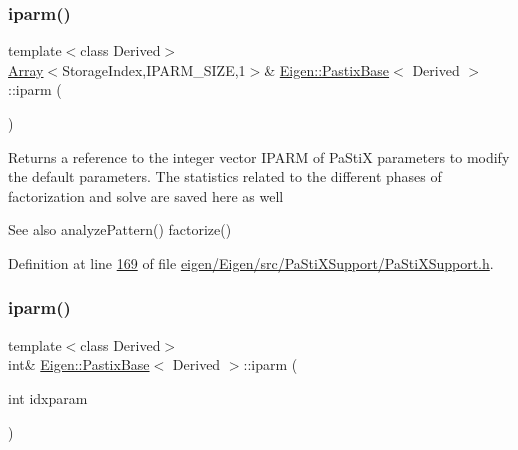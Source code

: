 \mbox{\label{class_eigen_1_1_pastix_base_a38378e7b2b5c750a8a23e2c21a69146c}} 
\subsubsection{\texorpdfstring{iparm()}{iparm()}\hspace{0.1cm}{\footnotesize\ttfamily [2/4]}}
{\footnotesize\ttfamily template$<$class Derived$>$ \\
\hyperlink{group___core___module_class_eigen_1_1_array}{Array}$<$Storage\+Index,I\+P\+A\+R\+M\+\_\+\+S\+I\+ZE,1$>$\& \hyperlink{class_eigen_1_1_pastix_base}{Eigen\+::\+Pastix\+Base}$<$ Derived $>$\+::iparm (\begin{DoxyParamCaption}{ }\end{DoxyParamCaption})\hspace{0.3cm}{\ttfamily [inline]}}

Returns a reference to the integer vector I\+P\+A\+RM of Pa\+StiX parameters to modify the default parameters. The statistics related to the different phases of factorization and solve are saved here as well \begin{DoxySeeAlso}{See also}
analyze\+Pattern() factorize() 
\end{DoxySeeAlso}


Definition at line \hyperlink{eigen_2_eigen_2src_2_pa_sti_x_support_2_pa_sti_x_support_8h_source_l00169}{169} of file \hyperlink{eigen_2_eigen_2src_2_pa_sti_x_support_2_pa_sti_x_support_8h_source}{eigen/\+Eigen/src/\+Pa\+Sti\+X\+Support/\+Pa\+Sti\+X\+Support.\+h}.

\mbox{\label{class_eigen_1_1_pastix_base_a5509ca8d6a9217fb95ab020363b9e0fb}} 
\subsubsection{\texorpdfstring{iparm()}{iparm()}\hspace{0.1cm}{\footnotesize\ttfamily [3/4]}}
{\footnotesize\ttfamily template$<$class Derived$>$ \\
int\& \hyperlink{class_eigen_1_1_pastix_base}{Eigen\+::\+Pastix\+Base}$<$ Derived $>$\+::iparm (\begin{DoxyParamCaption}\item[{int}]{idxparam }\end{DoxyParamCaption})\hspace{0.3cm}{\ttfamily [inline]}}

